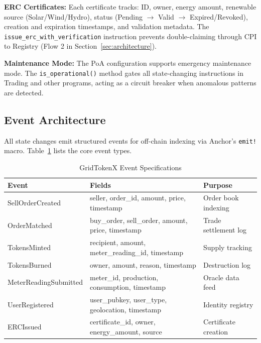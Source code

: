 \documentclass[conference]{IEEEtran}
\begin{document}
\textbf{ERC Certificates:} Each certificate tracks: ID, owner, energy amount, renewable source (Solar/Wind/Hydro), status (Pending $\rightarrow$ Valid $\rightarrow$ Expired/Revoked), creation and expiration timestamps, and validation metadata. The \texttt{issue\_erc\_with\_verification} instruction prevents double-claiming through CPI to Registry (Flow 2 in Section~\ref{sec:architecture}).

\textbf{Maintenance Mode:} The PoA configuration supports emergency maintenance mode. The \texttt{is\_operational()} method gates all state-changing instructions in Trading and other programs, acting as a circuit breaker when anomalous patterns are detected.

\subsection{Event Architecture}

All state changes emit structured events for off-chain indexing via Anchor's \texttt{emit!} macro. Table~\ref{tab:events} lists the core event types.

\begin{table}[htbp]
\caption{GridTokenX Event Specifications}
\begin{center}
\begin{tabular}{lp{5.5cm}p{4cm}}
\toprule
\textbf{Event} & \textbf{Fields} & \textbf{Purpose} \\
\midrule
SellOrderCreated & seller, order\_id, amount, price, timestamp & Order book indexing \\
OrderMatched & buy\_order, sell\_order, amount, price, timestamp & Trade settlement log \\
TokensMinted & recipient, amount, meter\_reading\_id, timestamp & Supply tracking \\
TokensBurned & owner, amount, reason, timestamp & Destruction log \\
MeterReadingSubmitted & meter\_id, production, consumption, timestamp & Oracle data feed \\
UserRegistered & user\_pubkey, user\_type, geolocation, timestamp & Identity registry \\
ERCIssued & certificate\_id, owner, energy\_amount, source & Certificate creation \\
\bottomrule
\end{tabular}
\label{tab:events}
\end{center}
\end{table}
\end{document}
